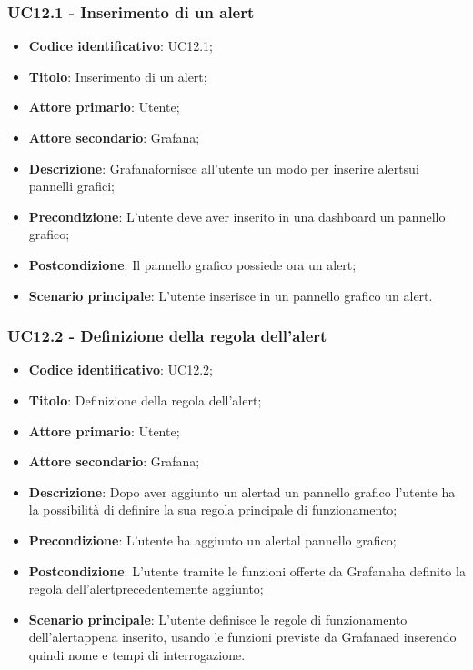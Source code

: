 \subsubsection{UC12.1 - Inserimento di un alert}
\begin{itemize}
	\item \textbf{Codice identificativo}: UC12.1;
	\item \textbf{Titolo}: Inserimento di un alert\glo;
	\item \textbf{Attore primario}: Utente;
	\item \textbf{Attore secondario}: Grafana\glo;
	\item \textbf{Descrizione}: Grafana\glosp fornisce all'utente un modo per inserire alert\glosp sui pannelli grafici;
	\item \textbf{Precondizione}: L'utente deve aver inserito in una dashboard un pannello grafico;
	\item \textbf{Postcondizione}: Il pannello grafico possiede ora un alert\glo;
	\item \textbf{Scenario principale}: L'utente inserisce in un pannello grafico un alert\glo.
\end{itemize}

\subsubsection{UC12.2 - Definizione della regola dell'alert}
\begin{itemize}
	\item \textbf{Codice identificativo}: UC12.2;
	\item \textbf{Titolo}: Definizione della regola dell'alert\glo;
	\item \textbf{Attore primario}: Utente;
	\item \textbf{Attore secondario}: Grafana\glo;
	\item \textbf{Descrizione}: Dopo aver aggiunto un alert\glosp ad un pannello grafico l'utente ha la possibilità di definire la sua regola principale di funzionamento;
	\item \textbf{Precondizione}: L'utente ha aggiunto un alert\glosp al pannello grafico;
	\item \textbf{Postcondizione}: L'utente tramite le funzioni offerte da Grafana\glosp ha definito la regola dell'alert\glosp precedentemente aggiunto;
	\item \textbf{Scenario principale}: L'utente definisce le regole di funzionamento dell'alert\glosp appena inserito, usando le funzioni previste da Grafana\glosp ed inserendo quindi nome e tempi di interrogazione.
\end{itemize}

